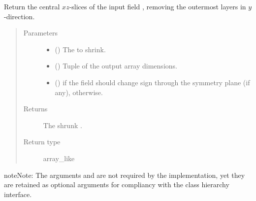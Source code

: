 \documentclass[letterpaper,10pt,english]{sphinxmanual}
\begin{document}
\begin{fulllineitems}
\begin{fulllineitems}
\label{\detokenize{api:dycore.horizontal_boundary_periodic.PeriodicXZ.from_computational_to_physical_domain}}
Return the central \(xz\)-slices of the input field , removing the  outermost
layers in \(y\)-direction.
\begin{quote}\begin{description}
\item[{Parameters}] \leavevmode\begin{itemize}
\item {} 
 () \textendash{} The  to shrink.

\item {} 
 () \textendash{} Tuple of the output array dimensions.

\item {} 
 () \textendash{}  if the field should change sign through the symmetry plane (if any),  otherwise.

\end{itemize}

\item[{Returns}] \leavevmode
The shrunk .

\item[{Return type}] \leavevmode
array\_like

\end{description}\end{quote}

\begin{sphinxadmonition}{note}{Note:}
The arguments  and  are not required by the implementation,
yet they are retained as optional arguments for compliancy with the class hierarchy interface.
\end{sphinxadmonition}

\end{fulllineitems}


\end{fulllineitems}
\end{document}
